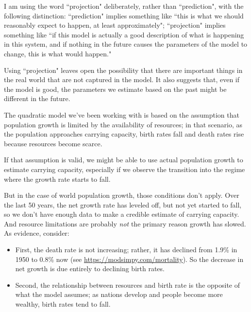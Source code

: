 \documentclass[12pt]{book}
\theoremstyle{exercise}
\begin{document}
I am using the word ``projection" deliberately, rather than ``prediction", with the following distinction: ``prediction" implies something like ``this is what we should reasonably expect to happen, at least approximately"; ``projection" implies something like ``if this model is actually a good description of what is happening in this system, and if nothing in the future causes the parameters of the model to change, this is what would happen."

Using ``projection" leaves open the possibility that there are important things in the real world that are not captured in the model.  It also suggests that, even if the model is good, the parameters we estimate based on the past might be different in the future.

The quadratic model we've been working with is based on the assumption that population growth is limited by the availability of resources; in that scenario, as the population approaches carrying capacity, birth rates fall and death rates rise because resources become scarce.


If that assumption is valid, we might be able to use actual population growth to estimate carrying capacity, especially if we observe the transition into the regime where the growth rate starts to fall.

But in the case of world population growth, those conditions don't apply.  Over the last 50 years, the net growth rate has leveled off, but not yet started to fall, so we don't have enough data to make a credible estimate of carrying capacity.  And resource limitations are probably {\em not} the primary reason growth has slowed.  As evidence, consider:

\begin{itemize}

\item First, the death rate is not increasing; rather, it has declined from 1.9\% in 1950 to 0.8\% now (see \url{https://modsimpy.com/mortality}).  So the decrease in net growth is due entirely to declining birth rates.


\item Second, the relationship between resources and birth rate is the opposite of what the model assumes; as nations develop and people become more wealthy, birth rates tend to fall.  


\end{itemize} 
\end{document}
